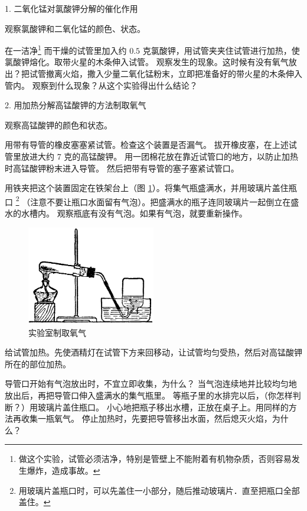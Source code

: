 \begin{shiyanbuzhou}
    1. 二氧化锰对氯酸钾分解的催化作用

    观察氯酸钾和二氧化锰的颜色、状态。

    在一洁净\footnote{做这个实验，试管必须洁净，特别是管壁上不能附着有机物杂质，否则容易发生爆炸，造成事故。}
    而干燥的试管里加入约 $0.5$ 克氯酸钾，用试管夹夹住试管进行加热，使氯酸钾熔化。取带火星的木条伸入试管。
    观察发生的现象。这时候有没有氧气放出？把试管撤离火焰，撒入少量二氧化锰粉末，立即把准备好的带火星的木条伸入管内。
    观察到什么现象？从这个实验得出什么结论？

    2. 用加热分解高锰酸钾的方法制取氧气

    观察高锰酸钾的颜色和状态。

    用带有导管的橡皮塞塞紧试管。检查这个装置是否漏气。
    拔开橡皮塞，在上述试管里放进大约 7 克的高锰酸钾。
    用一团棉花放在靠近试管口的地方，以防止加热时高锰酸钾粉末进入导管。
    然后把带有导管的塞子塞紧试管口。

    用铁夹把这个装置固定在铁架台上（图 \ref{fig:xssy-18}）。将集气瓶盛满水，并用玻璃片盖住瓶口%
    \footnote{用玻璃片盖瓶口时，可以先盖住一小部分，随后推动玻璃片．直至把瓶口全部盖住。}
    （注意不要让瓶口水面留有气泡）。把盛满水的瓶子连同玻璃片一起倒立在盛水的水槽内。
    观察瓶底有没有气泡。如果有气泡，就要重新操作。

    \begin{figure}[htbp]
        \centering
        \includegraphics[width=0.5\textwidth]{../pic/czhx1-xssy-18}
        \caption{实验室制取氧气}\label{fig:xssy-18}
    \end{figure}


    给试管加热。先使酒精灯在试管下方来回移动，让试管均匀受热，然后对高锰酸钾所在的部位加热。

    导管口开始有气泡放出时，不宜立即收集，为什么？
    当气泡连续地并比较均匀地放出后，再把导管口伸入盛满水的集气瓶里。
    等瓶子里的水排完以后，（你怎样判断？）用玻璃片盖住瓶口。
    小心地把瓶子移出水槽，正放在桌子上。用同样的方法再收集一瓶氧气。
    停止加热时，先要把导管移出水面，然后熄灭火焰，为什么？


\end{shiyanbuzhou}
